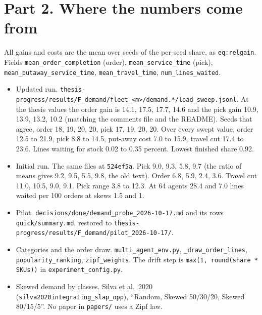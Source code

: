 \documentclass[11pt,a4paper]{article}
\newcommand{\lref}[1]{{\small\texttt{#1}}}
\begin{document}
\section*{Part 2. Where the numbers come from}
All gains and costs are the mean over seeds of the per-seed share, as
\lref{eq:relgain}. Fields \texttt{mean\_order\_completion} (order),
\texttt{mean\_service\_time} (pick), \texttt{mean\_putaway\_service\_time},
\texttt{mean\_travel\_time}, \texttt{num\_lines\_waited}.
\begin{itemize}[nosep]
  \item Updated run. \texttt{thesis-progress/results/F\_demand/fleet\_<m>/demand.*/load\_sweep.jsonl}.
        At the thesis values the order gain is 14.1, 17.5, 17.7, 14.6 and the pick gain
        10.9, 13.9, 13.2, 10.2 (matching the comments file and the README). Seeds that
        agree, order 18, 19, 20, 20, pick 17, 19, 20, 20. Over every swept value, order
        12.5 to 21.9, pick 8.8 to 14.5, put-away cost 7.0 to 15.9, travel cut 17.4 to
        23.6. Lines waiting for stock 0.02 to 0.35 percent. Lowest finished share 0.92.
  \item Initial run. The same files at \texttt{524ef5a}. Pick 9.0, 9.3, 5.8, 9.7 (the
        ratio of means gives 9.2, 9.5, 5.5, 9.8, the old text). Order 6.8, 5.9, 2.4, 3.6.
        Travel cut 11.0, 10.5, 9.0, 9.1. Pick range 3.8 to 12.3. At 64 agents 28.4 and
        7.0 lines waited per 100 orders at skews 1.5 and 1.
  \item Pilot. \texttt{decisions/done/demand\_probe\_2026-10-17.md} and its rows
        \texttt{quick/summary.md}, restored to
        \texttt{thesis-progress/results/F\_demand/pilot\_2026-10-17/}.
  \item Categories and the order draw. \texttt{multi\_agent\_env.py},
        \texttt{\_draw\_order\_lines}, \texttt{popularity\_ranking},
        \texttt{zipf\_weights}. The drift step is
        \texttt{max(1, round(share * SKUs))} in \texttt{experiment\_config.py}.
  \item Skewed demand by classes. Silva et al.\ 2020
        (\texttt{silva2020integrating\_slap\_opp}), ``Random, Skewed 50/30/20,
        Skewed 80/15/5''. No paper in \texttt{papers/} uses a Zipf law.
\end{itemize}
\end{document}
